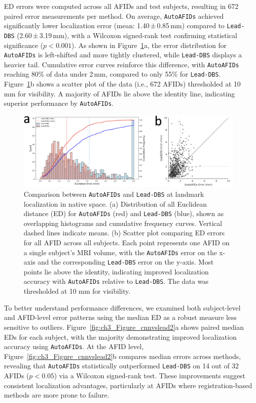 ED errors were computed across all AFIDs and test subjects, resulting in 672 paired error measurements per method. On average, \texttt{AutoAFIDs} achieved significantly lower localization error (mean: 1.40\,±\,0.85\,mm) compared to \texttt{Lead-DBS} (2.60\,±\,3.19\,mm), with a Wilcoxon signed-rank test confirming statistical significance (\(p < 0.001\)). As shown in Figure~\ref{fig:ch3_Figure_cnnvslead1}a, the error distribution for \texttt{AutoAFIDs} is left-shifted and more tightly clustered, while \texttt{Lead-DBS} displays a heavier tail. Cumulative error curves reinforce this difference, with \texttt{AutoAFIDs} reaching 80\% of data under 2\,mm, compared to only 55\% for \texttt{Lead-DBS}. Figure~\ref{fig:ch3_Figure_cnnvslead1}b shows a scatter plot of the data (i.e., 672 AFIDs) thresholded at 10 mm for visibility. A majority of AFIDs lie above the identity line, indicating superior performance by \texttt{AutoAFIDs}.
\begin{figure}[hbt!]
    \centering
    \includegraphics[width=1\linewidth]{figs/ch3_Figure_cnnvslead1.png}
    \caption{Comparison between \texttt{AutoAFIDs} and \texttt{Lead-DBS} at landmark localization in native space. (a) Distribution of all Euclidean distance (ED) for \texttt{AutoAFIDs} (red) and \texttt{Lead-DBS} (blue), shown as overlapping histograms and cumulative frequency curves. Vertical dashed lines indicate means. (b) Scatter plot comparing ED errors for all AFID across all subjects. Each point represents one AFID on a single subject's MRI volume, with the \texttt{AutoAFIDs} error on the x-axis and the corresponding \texttt{Lead-DBS} error on the y-axis. Most points lie above the identity, indicating improved localization accuracy with \texttt{AutoAFIDs} relative to \texttt{Lead-DBS}. The data was thresholded at 10 mm for visibility.}
    \label{fig:ch3_Figure_cnnvslead1}
\end{figure}
\newpage
To better understand performance differences, we examined both subject-level and AFID-level error patterns using the median ED as a robust measure less sensitive to outliers. Figure~\ref{fig:ch3_Figure_cnnvslead2}a shows paired median EDs for each subject, with the majority demonstrating improved localization accuracy using \texttt{AutoAFIDs}. At the AFID level, Figure~\ref{fig:ch3_Figure_cnnvslead2}b compares median errors across methods, revealing that \texttt{AutoAFIDs} statistically outperformed \texttt{Lead-DBS} on 14 out of 32 AFIDs (\(p < 0.05\)) via a Wilcoxon signed-rank test. These improvements suggest consistent localization advantages, particularly at AFIDs where registration-based methods are more prone to failure.


